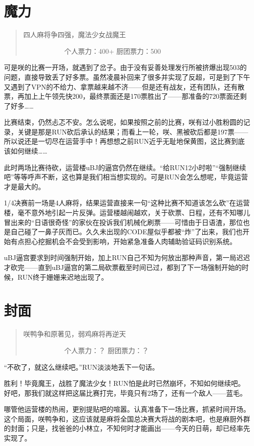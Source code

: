 \section{魔力}
\begin{quote}
四人麻将争四强，魔法少女战魔王

　　　　　　个人票力：400+ 厨团票力：500
\end{quote}

可是咲的比赛一开场，就遇到了岔子。由于没有妥善处理发行所被挤爆出现503的问题，直接导致丢了好多票。虽然凌晨补回来了很多并实现了反超，可是到了下午又遇到了VPN的不给力、拿票越来越不济——但是还有战友，还有团队，还有散票，再加上上午领先快200，最终票面还是170票胜出了——那准备的720票面还剩了好多……

比赛结束，仍然忐忑不安。怎么说呢，如果按照之前的比赛，咲有过小胜粉圆的记录，关键是那是RUN砍后承认的结果；而看上一轮，咲、黑被砍后都是197票——所以说还是一切尽在运营手中！再想想之前RUN近乎无耻地保黄图，这比赛到底该如何继续……

此时两场比赛待砍，运营楼uBJ的逼宫仍然在继续。“给RUN12小时啦”“强制继续吧”等等呼声不断，这也算是我们相当想实现的。可是RUN会怎么想呢，毕竟运营才是最大的。

1/4决赛前一场是4人麻将，结果运营直接来一句“这种比赛不知道该怎么砍”在运营楼，毫不意外地引起一片反弹。运营楼越闹越欢，关于砍票、日程，还有不知哪儿冒出来的“日语很奇怪”的家伙在投诉我们机械化刷票——可惜由于日语渣，那位也是自己碰了一鼻子灰而已。久久未出现的CODE屋似乎都被“炸”了出来，我们也开始有点担心挖掘机会不会受到影响，开始紧急准备人肉辅助验证码识别系统。

uBJ逼宫要求到时间强制开始，加上RUN自己不知为何放出那种声音，第一局迟迟才砍完——直到uBJ逼宫的第二局砍票截至时间已过，都到了下一场强制开始的时候，RUN终于姗姗来迟地出现了。


\section{封面}
\begin{quote}
咲鸭争和原著见，弱鸡麻将再逆天

　　　　　　个人票力：？ 厨团票力：？
\end{quote}

“不砍了，就这么继续吧。”RUN淡淡地丢下一句话。

胜利！毕竟魔王，战胜了魔法少女！RUN怕是此时已然崩坏，不知如何继续吧。好吧，那我们就这样把这届比赛打完，毕竟只有2场了，还有一个敌人——蓝毛。

哪管他运营楼的热闹，更别提贴吧的喧嚣。认真准备下一场比赛，抓紧时间开场。这个局面，咲鸭争和，这应该就是麻将全国总决赛大将战的剧本吧，也是麻厨外群的封面；只是，找爸爸的小林立，不知何时才能画出——今天的日萌，却已经率先实现了。

